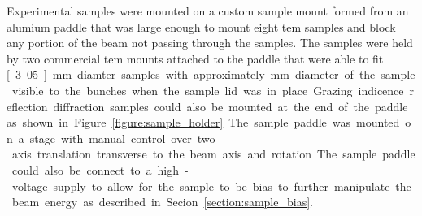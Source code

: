 Experimental samples were mounted on a custom sample mount formed from an alumium paddle that was large enough to mount eight \gls{tem} samples and block any portion of the beam not passing through the samples.
The samples were held by two commercial \gls{tem} mounts attached to the paddle that were able to fit \unit[3.05]{mm} diamter samples with approximately \unit[2]{mm} diameter of the sample visible to the bunches when the sample lid was in place.
Grazing indicence reflection diffraction samples could also be mounted at the end of the paddle as shown in Figure~\ref{figure:sample_holder}.
The sample paddle was mounted on a stage with manual control over two-axis translation transverse to the beam axis and rotation.
The sample paddle could also be connect to a high-voltage supply to allow for the sample to be bias to further manipulate the beam energy as described in Secion~\ref{section:sample_bias}.

